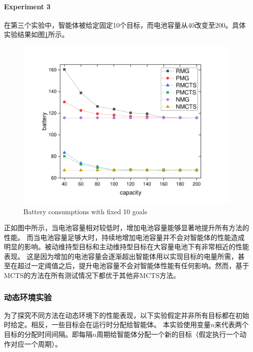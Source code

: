 \paragraph{Experiment 3}
在第三个实验中，智能体被给定固定10个目标，而电池容量从40改变至200。具体实验结果如图\ref{fig:static4}所示。
\begin{figure}[h!]
\centering
\includegraphics[scale=0.4]{./figs/cX_cY_fixG10}
\captionsetup{justification=centering}
\caption{Battery consumptions with fixed 10 goals}
\label{fig:static4}
\end{figure}

正如图中所示，当电池容量相对较低时，增加电池容量能够显著地提升所有方法的性能。
%
而当电池容量足够大时，持续地增加电池容量并不会对智能体的性能造成明显的影响。被动维持型目标和主动维持型目标在大容量电池下有非常相近的性能表现。
%
这是因为增加的电池容量会逐渐超出智能体用以实现目标的电量所需，甚至在超过一定阈值之后，提升电池容量不会对智能体性能有任何影响。然而，基于MCTS的方法在所有测试情况下都优于其他非MCTS方法。

\subsubsection{动态环境实验}
为了探究不同方法在动态环境下的性能表现，以下实验假定并非所有目标都在初始时给定。相反，一些目标会在运行时分配给智能体。
%
本实验使用变量$n$来代表两个目标的分配时间间隔。即每隔$n$周期给智能体分配一个新的目标（假定执行一个动作对应一个周期）。

